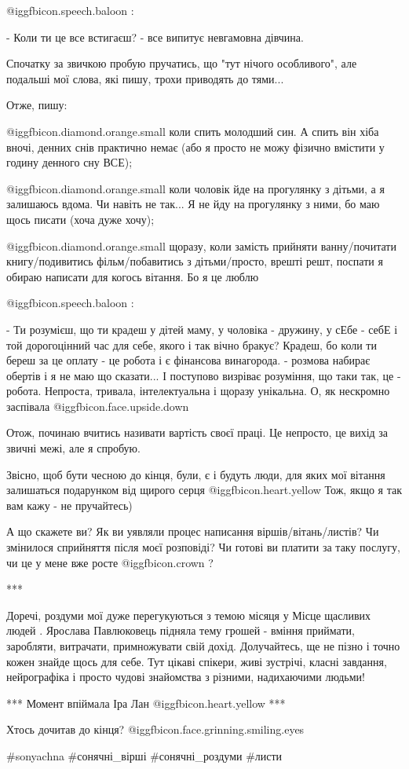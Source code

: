 @igg{fbicon.speech.baloon} :

- Коли ти це все встигаєш? - все випитує невгамовна дівчина. 

Спочатку за звичкою пробую пручатись, що "тут нічого особливого", але подальші
мої слова, які пишу, трохи приводять до тями... 

Отже, пишу:

 @igg{fbicon.diamond.orange.small} коли спить молодший син. А спить він хіба вночі, денних снів практично немає
(або я просто не можу фізично вмістити у годину денного сну ВСЕ);

 @igg{fbicon.diamond.orange.small} коли чоловік йде на прогулянку з дітьми, а я залишаюсь вдома. Чи навіть не
так... Я не йду на прогулянку з ними, бо маю щось писати (хоча дуже хочу);

 @igg{fbicon.diamond.orange.small} щоразу, коли замість прийняти ванну/почитати книгу/подивитись
фільм/побавитись з дітьми/просто, врешті решт, поспати я обираю написати для
когось вітання. Бо я це люблю🫶

@igg{fbicon.speech.baloon} :

- Ти розумієш, що ти крадеш у дітей маму, у чоловіка - дружину, у сЕбе - себЕ і
той дорогоцінний час для себе, якого і так вічно бракує? Крадеш, бо коли ти
береш за це оплату - це робота і є фінансова винагорода. - розмова набирає
обертів і я не маю що сказати... І поступово визріває розуміння, що таки так,
це - робота. Непроста, тривала, інтелектуальна і щоразу унікальна. О, як
нескромно заспівала  @igg{fbicon.face.upside.down}  

Отож, починаю вчитись називати вартість своєї праці. Це непросто, це вихід за
звичні межі, але я спробую. 

Звісно, щоб бути чесною до кінця, були, є і будуть люди, для яких мої вітання
залишаться подарунком від щирого серця @igg{fbicon.heart.yellow}  Тож, якщо я
так вам кажу - не пручайтесь) 

А що скажете ви? Як ви уявляли процес написання віршів/вітань/листів? Чи
змінилося сприйняття після моєї розповіді? Чи готові ви платити за таку
послугу, чи це у мене вже росте  @igg{fbicon.crown} ?

***

Доречі, роздуми мої дуже перегукуються з темою місяця у Місце щасливих людей .
Ярослава Павлюковець підняла тему грошей - вміння приймати, заробляти,
витрачати, примножувати свій дохід. Долучайтесь, ще не пізно і точно кожен
знайде щось для себе. Тут цікаві спікери, живі зустрічі, класні завдання,
нейрографіка і просто чудові знайомства з різними, надихаючими людьми! 

***
Момент впіймала Іра Лан  @igg{fbicon.heart.yellow} 
***

Хтось дочитав до кінця? @igg{fbicon.face.grinning.smiling.eyes} 

\#sonyachna \#сонячні\_вірші \#сонячні\_роздуми \#листи

